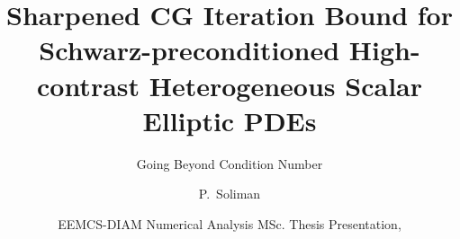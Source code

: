 \documentclass[t, aspectratio=169, english, table]{tudelft-beamer}
\title[]{Sharpened CG Iteration Bound for Schwarz-preconditioned High-contrast Heterogeneous Scalar Elliptic PDEs}
\subtitle{Going Beyond Condition Number}
\author[]{P.~Soliman\inst{1}}
\institute[University]{
  \strut\llap{\inst{1}\,}Delft University of Technology
}
\date[EEMCS-DIAM-NA MSc. Thesis \monthyeardate]{EEMCS-DIAM Numerical Analysis MSc. Thesis Presentation, \monthyeardate}
\begin{document}
\titleframe














\end{document}
